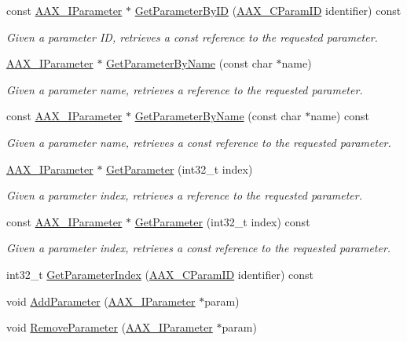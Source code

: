 \begin{DoxyCompactItemize}
const \mbox{\hyperlink{a01857}{A\+A\+X\+\_\+\+I\+Parameter}} $\ast$ \mbox{\hyperlink{a01545_abeaa97c1e5de198f4c4bc53a3d45de62}{Get\+Parameter\+By\+ID}} (\mbox{\hyperlink{a00392_a1440c756fe5cb158b78193b2fc1780d1}{A\+A\+X\+\_\+\+C\+Param\+ID}} identifier) const
\begin{DoxyCompactList}\small\item\em Given a parameter ID, retrieves a const reference to the requested parameter. \end{DoxyCompactList}\item 
\mbox{\hyperlink{a01857}{A\+A\+X\+\_\+\+I\+Parameter}} $\ast$ \mbox{\hyperlink{a01545_a65819f05cca51224d92ac0b620d2b354}{Get\+Parameter\+By\+Name}} (const char $\ast$name)
\begin{DoxyCompactList}\small\item\em Given a parameter name, retrieves a reference to the requested parameter. \end{DoxyCompactList}\item 
const \mbox{\hyperlink{a01857}{A\+A\+X\+\_\+\+I\+Parameter}} $\ast$ \mbox{\hyperlink{a01545_aa5df52599721038b86b9c3bcf57b53e8}{Get\+Parameter\+By\+Name}} (const char $\ast$name) const
\begin{DoxyCompactList}\small\item\em Given a parameter name, retrieves a const reference to the requested parameter. \end{DoxyCompactList}\item 
\mbox{\hyperlink{a01857}{A\+A\+X\+\_\+\+I\+Parameter}} $\ast$ \mbox{\hyperlink{a01545_aaee339546c6cf99e3b7c8a6061c7a4f3}{Get\+Parameter}} (int32\+\_\+t index)
\begin{DoxyCompactList}\small\item\em Given a parameter index, retrieves a reference to the requested parameter. \end{DoxyCompactList}\item 
const \mbox{\hyperlink{a01857}{A\+A\+X\+\_\+\+I\+Parameter}} $\ast$ \mbox{\hyperlink{a01545_a473f13ba70dd8860e573bcf850fa7e05}{Get\+Parameter}} (int32\+\_\+t index) const
\begin{DoxyCompactList}\small\item\em Given a parameter index, retrieves a const reference to the requested parameter. \end{DoxyCompactList}\item 
int32\+\_\+t \mbox{\hyperlink{a01545_ad4322f62f0ea9c9481979db4792715be}{Get\+Parameter\+Index}} (\mbox{\hyperlink{a00392_a1440c756fe5cb158b78193b2fc1780d1}{A\+A\+X\+\_\+\+C\+Param\+ID}} identifier) const
\item 
void \mbox{\hyperlink{a01545_ae2f9631b33c012f7a8c042df9655b28c}{Add\+Parameter}} (\mbox{\hyperlink{a01857}{A\+A\+X\+\_\+\+I\+Parameter}} $\ast$param)
\item 
void \mbox{\hyperlink{a01545_ac3a21fe1267f8fb276aa08e9f492c5ed}{Remove\+Parameter}} (\mbox{\hyperlink{a01857}{A\+A\+X\+\_\+\+I\+Parameter}} $\ast$param)
\end{DoxyCompactItemize}
